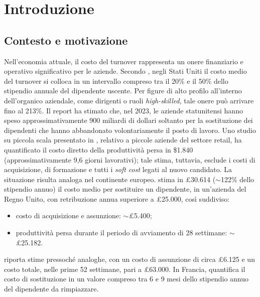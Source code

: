 \chapter{Introduzione}

\section{Contesto e motivazione}

Nell'economia attuale, il costo del turnover rappresenta un onere finanziario e operativo significativo per le aziende.
Secondo \cite{Boushey2012}, negli Stati Uniti il costo medio del turnover si colloca in un intervallo compreso tra il 20\% e il 50\% dello stipendio annuale del dipendente uscente. Per figure di alto profilo all'interno dell'organico aziendale, come dirigenti o ruoli \textit{high-skilled}, tale onere può arrivare fino al 213\%.
Il report \cite{WorkInstitute2024} ha stimato che, nel 2023, le aziende statunitensi hanno speso approssimativamente 900 miliardi di dollari soltanto per la sostituzione dei dipendenti che hanno abbandonato volontariamente il posto di lavoro.
Uno studio su piccola scala presentato in \cite{Kuhn2021}, relativo a piccole aziende del settore retail, ha quantificato il costo diretto della produttività persa in \$1.840 (approssimativamente 9,6 giorni lavorativi); tale stima, tuttavia, esclude i costi di acquisizione, di formazione e tutti i \textit{soft cost} legati al nuovo candidato.
La situazione risulta analoga nel continente europeo. \cite{Price2020} stima in £30.614 ($\sim$122\% dello stipendio annuo) il costo medio per sostituire un dipendente, in un'azienda del Regno Unito, con retribuzione annua superiore a £25.000, così suddiviso:
\begin{itemize}
    \item costo di acquisizione e assunzione: $\sim$£5.400;
    \item produttività persa durante il periodo di avviamento di 28 settimane: $\sim$£25.182.
\end{itemize}
\cite{CIPD2025} riporta stime pressoché analoghe, con un costo di assunzione di circa £6.125 e un costo totale, nelle prime 52 settimane, pari a £63.000.
In Francia, \cite{Elevo2023} quantifica il costo di sostituzione in un valore compreso tra 6 e 9 mesi dello stipendio annuo del dipendente da rimpiazzare.

